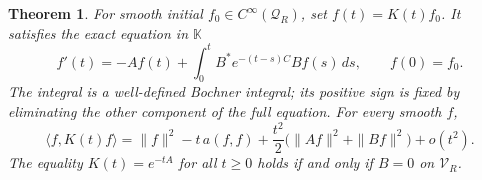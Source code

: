 \documentclass[11pt]{article}
\newtheorem{theorem}{Theorem}
\begin{document}
\begin{theorem}\label{thm:memory}
For smooth initial $f_0\in C^\infty(\mathcal Q_R)$, set
$f(t)=K(t)f_0$. It satisfies the exact equation in $\mathbb K$
\begin{equation}\label{eq:memory}
 f'(t)=-Af(t)+\int_0^t B^*e^{-(t-s)C}Bf(s)\,ds,
 \qquad f(0)=f_0.
\end{equation}
The integral is a well-defined Bochner integral; its positive sign is
fixed by eliminating the other component of the full equation.
For every smooth $f$,
\begin{equation}\label{eq:secondmoment}
 \langle f,K(t)f\rangle
 =\|f\|^2-t\,a(f,f)
       +\frac{t^2}{2}\bigl(\|Af\|^2+\|Bf\|^2\bigr)+o(t^2).
\end{equation}
The equality $K(t)=e^{-tA}$ for all $t\geq0$ holds if and only if
$B=0$ on $\mathcal V_R$.
\end{theorem}
\end{document}
